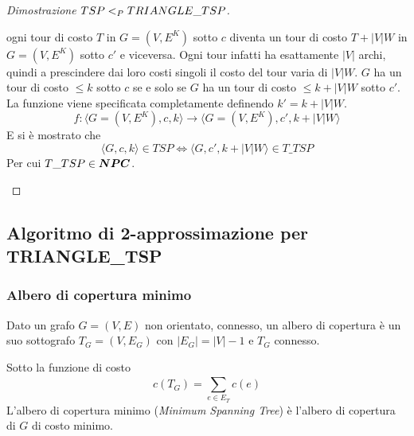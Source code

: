 \begin{proof}[Dimostrazione $TSP <_P TRIANGLE\_TSP$]
\begin{itemize}
            ogni tour di costo $T$ in
            $G=(V,E^K)$
            sotto $c$ diventa un tour di costo $T + |V| W$ in 
            $G=(V,E^K)$ sotto $c'$ e viceversa.
            Ogni tour infatti ha esattamente $|V|$ archi, quindi a prescindere dai loro costi singoli il costo del tour varia di $|V|W$.
            $G$ ha un tour di costo $\leq k$ sotto $c$
            se e solo se 
            $G$ ha un tour di costo $\leq k +|V|W$ sotto $c'$.
            La funzione viene specificata completamente definendo $k' = k + |V|W$.
            \begin{equation*}
                f :
                \langle
                G = (V,E^K), c, k
                \rangle
                \to
                \langle
                G = (V,E^K), c', k+|V|W
                \rangle
            \end{equation*}
            E si è mostrato che
            \begin{equation*}
                \langle
                G, c, k
                \rangle
                \in TSP
                \Leftrightarrow
                \langle
                G, c', k+|V|W
                \rangle
                \in T\_TSP
            \end{equation*}
                Per cui $T\_TSP \in \bm{NPC}$.
    \end{itemize}
\end{proof}

\subsection{Algoritmo di 2-approssimazione per  TRIANGLE\_TSP}
\label{sss:ttsp2approx}

\subsubsection{Albero di copertura minimo}
\begin{definition}
    \label{def:alberocopertura}
    Dato un grafo
    $G=(V,E)$
    non orientato, connesso, un albero di copertura è un suo sottografo 
    $T_G=(V,E_G)$
    con $|E_G|=|V|-1$ e $T_G$ connesso.
\end{definition}

\begin{definition}
    \label{def:alberocoperturaminimo}
    Sotto la funzione di costo
    \begin{equation*}
        c\left( T_G \right) = 
        \sum_{e \in E_T}^{} c(e)
    \end{equation*}
    L'albero di copertura minimo (\emph{Minimum Spanning Tree}) è l'albero di copertura di $G$ di costo minimo.
\end{definition}

